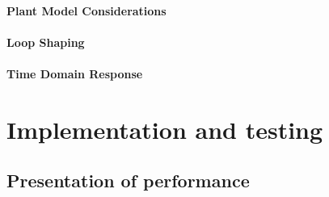 \documentclass[11pt, a4paper,twocolumn]{article}
\begin{document}
	\paragraph{		Plant Model Considerations		}
						
			
	\paragraph{		Loop Shaping		}
			
	\paragraph{		Time Domain Response		}
			
	
			
    \section{Implementation and testing}\label{sec:test}
        \subsection{Presentation of performance}\label{subsec:performance}
\end{document}
